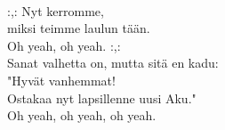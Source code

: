 \hspace{10mm} \\ :,: Nyt kerromme,  \\ miksi teimme laulun tään.    \\ Oh yeah, oh yeah. :,: \\ Sanat valhetta on, mutta sitä en kadu:  \\ "Hyvät vanhemmat!  \\ Ostakaa nyt lapsillenne uusi Aku."  \\ Oh yeah, oh yeah, oh yeah.